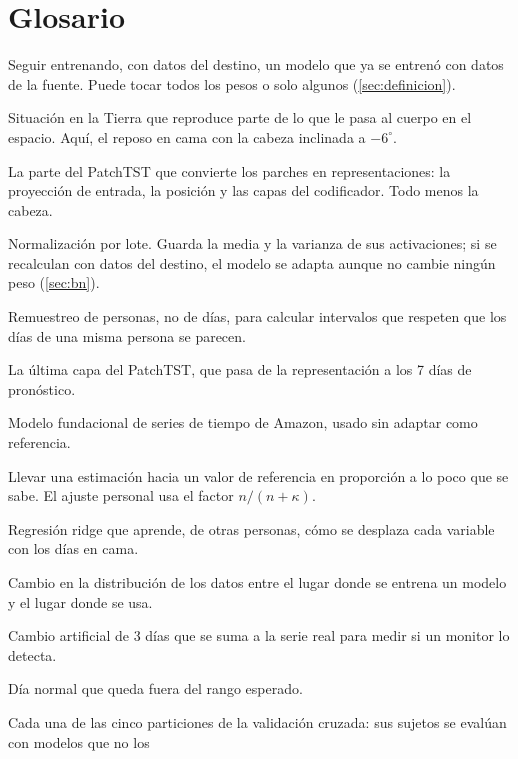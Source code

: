 \chapter{Glosario}\label{ap:glosario}

\begin{description}[style=nextline, leftmargin=1.2em, itemsep=3pt]
\item[Ajuste fino] Seguir entrenando, con datos del destino, un modelo que ya se entrenó con datos de la fuente. Puede
  tocar todos los pesos o solo algunos (\cref{sec:definicion}).
\item[Análogo] Situación en la Tierra que reproduce parte de lo que le pasa al cuerpo en el espacio. Aquí, el reposo en
  cama con la cabeza inclinada a $-6^\circ$.
\item[Backbone] La parte del PatchTST que convierte los parches en representaciones: la proyección de entrada, la
  posición y las capas del codificador. Todo menos la cabeza.
\item[BatchNorm] Normalización por lote. Guarda la media y la varianza de sus activaciones; si se recalculan con datos
  del destino, el modelo se adapta aunque no cambie ningún peso (\cref{sec:bn}).
\item[Bootstrap por sujetos] Remuestreo de personas, no de días, para calcular intervalos que respeten que los días de
  una misma persona se parecen.
\item[Cabeza] La última capa del PatchTST, que pasa de la representación a los 7 días de pronóstico.
\item[Chronos-2] Modelo fundacional de series de tiempo de Amazon, usado sin adaptar como referencia.
\item[Contracción] Llevar una estimación hacia un valor de referencia en proporción a lo poco que se sabe. El ajuste
  personal usa el factor $n/(n+\kappa)$.
\item[Corrector poblacional] Regresión ridge que aprende, de otras personas, cómo se desplaza cada variable con los
  días en cama.
\item[Desplazamiento de dominio] Cambio en la distribución de los datos entre el lugar donde se entrena un modelo y el
  lugar donde se usa.
\item[Escalón sintético] Cambio artificial de 3 días que se suma a la serie real para medir si un monitor lo detecta.
\item[Falsa alarma] Día normal que queda fuera del rango esperado.
\item[Fold] Cada una de las cinco particiones de la validación cruzada: sus sujetos se evalúan con modelos que no los

\end{description}
